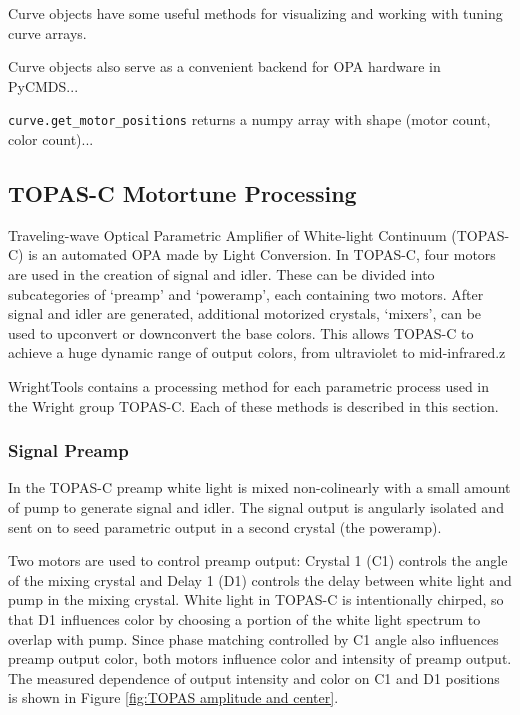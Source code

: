 \documentclass[11pt]{article}
\begin{document}
Curve objects have some useful methods for visualizing and working with tuning curve arrays. 


Curve objects also serve as a convenient backend for OPA hardware in PyCMDS...

\texttt{curve.get\_motor\_positions} returns a numpy array with shape (motor count, color count)...


\subsection{TOPAS-C Motortune Processing}

Traveling-wave Optical Parametric Amplifier of White-light Continuum (TOPAS-C) is an automated OPA made by Light Conversion. In TOPAS-C, four motors are used in the creation of signal and idler. These can be divided into subcategories of `preamp' and `poweramp', each containing two motors. After signal and idler are generated, additional motorized crystals, `mixers', can be used to upconvert or downconvert the base colors. This allows TOPAS-C to achieve a huge dynamic range of output colors, from ultraviolet to mid-infrared.z

WrightTools contains a processing method for each parametric process used in the Wright group TOPAS-C. Each of these methods is described in this section.

\subsubsection{Signal Preamp}

In the TOPAS-C preamp white light is mixed non-colinearly with a small amount of pump to generate signal and idler. The signal output is angularly isolated and sent on to seed parametric output in a second crystal (the poweramp). 

Two motors are used to control preamp output: Crystal 1 (C1) controls the angle of the mixing crystal and Delay 1 (D1) controls the delay between white light and pump in the mixing crystal. White light in TOPAS-C is intentionally chirped, so that D1 influences color by choosing a portion of the white light spectrum to overlap with pump. Since phase matching controlled by C1 angle also influences preamp output color, both motors influence color and intensity of preamp output. The measured dependence of output intensity and color on C1 and D1 positions is shown in Figure \ref{fig:TOPAS amplitude and center}.
\end{document}
